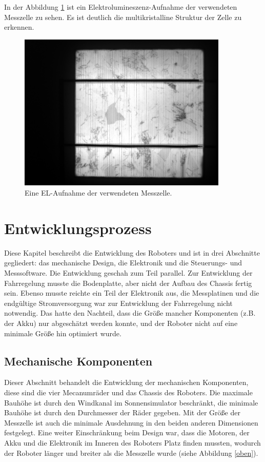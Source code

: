 \documentclass[a4paper,bibtotoc,oneside]{scrbook}
\begin{document}
In der Abbildung \ref{el} ist ein Elektrolumineszenz-Aufnahme der verwendeten Messzelle zu sehen. Es ist deutlich die multikristalline Struktur der Zelle zu erkennen. 

\begin{figure}[htbp]
\centering
\includegraphics[width=100mm]{img/el.png}
\caption{Eine EL-Aufnahme der verwendeten Messzelle.}\label{el}
\end{figure}

\chapter{Entwicklungsprozess}\thispagestyle{empty}

Diese Kapitel beschreibt die Entwicklung des Roboters und ist in drei Abschnitte gegliedert: das mechanische Design, die Elektronik und die Steuerungs- und Messsoftware.
Die Entwicklung geschah zum Teil parallel. Zur Entwicklung der Fahrregelung musste die Bodenplatte, aber nicht der Aufbau des Chassis fertig sein. Ebenso musste reichte ein Teil der Elektronik aus, die Messplatinen und die endgültige Stromversorgung war zur Entwicklung der Fahrregelung nicht notwendig. Das hatte den Nachteil, dass die Größe mancher Komponenten (z.B. der Akku) nur abgeschätzt werden konnte, und der Roboter nicht auf eine minimale Größe hin optimiert wurde.

\section{Mechanische Komponenten}\thispagestyle{empty}

Dieser Abschnitt behandelt die Entwicklung der mechanischen Komponenten, diese sind die vier Mecanumräder und das Chassis des Roboters. Die maximale Bauhöhe ist durch den Windkanal im Sonnensimulator beschränkt, die minimale Bauhöhe ist durch den Durchmesser der Räder gegeben.
Mit der Größe der Messzelle ist auch die minimale Ausdehnung in den beiden anderen Dimensionen festgelegt. Eine weiter Einschränkung beim Design war, dass die Motoren, der Akku und die Elektronik im Inneren des Roboters Platz finden mussten, wodurch der Roboter länger und breiter als die Messzelle wurde (siehe Abbildung \ref{oben}).
\end{document}
